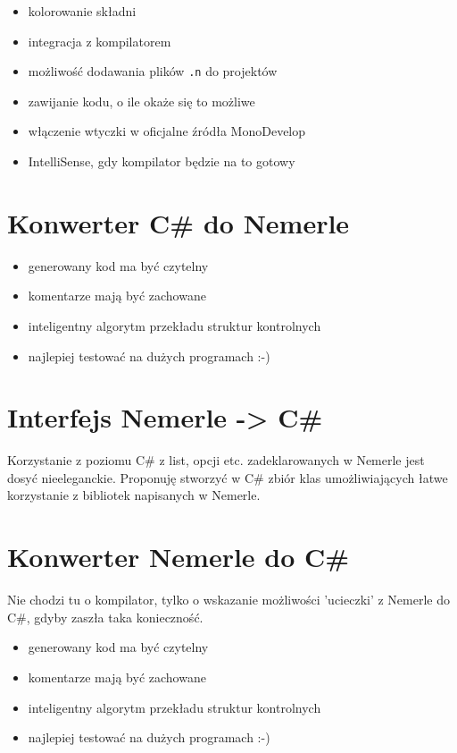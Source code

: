 \documentclass{article}
\begin{document}
\begin{itemize}
\item kolorowanie składni
\item integracja z kompilatorem
\item możliwość dodawania plików \verb,.n, do projektów
\item zawijanie kodu, o ile okaże się to możliwe
\item włączenie wtyczki w oficjalne źródła MonoDevelop
\item IntelliSense, gdy kompilator będzie na to gotowy
\end{itemize}


\section{Konwerter C\# do Nemerle}

\begin{itemize}
\item generowany kod ma być czytelny
\item komentarze mają być zachowane
\item inteligentny algorytm przekładu struktur kontrolnych
\item najlepiej testować na dużych programach :-)
\end{itemize}


\section{Interfejs Nemerle -> C\#}

Korzystanie z poziomu C\# z list, opcji etc. zadeklarowanych w Nemerle
jest dosyć nieeleganckie. Proponuję stworzyć w C\# zbiór klas umożliwiających
łatwe korzystanie z bibliotek napisanych w Nemerle.


\section{Konwerter Nemerle do C\#}

Nie chodzi tu o kompilator, tylko o wskazanie możliwości 'ucieczki'
z Nemerle do C\#, gdyby zaszła taka konieczność.

\begin{itemize}
\item generowany kod ma być czytelny
\item komentarze mają być zachowane
\item inteligentny algorytm przekładu struktur kontrolnych
\item najlepiej testować na dużych programach :-)
\end{itemize}
\end{document}
